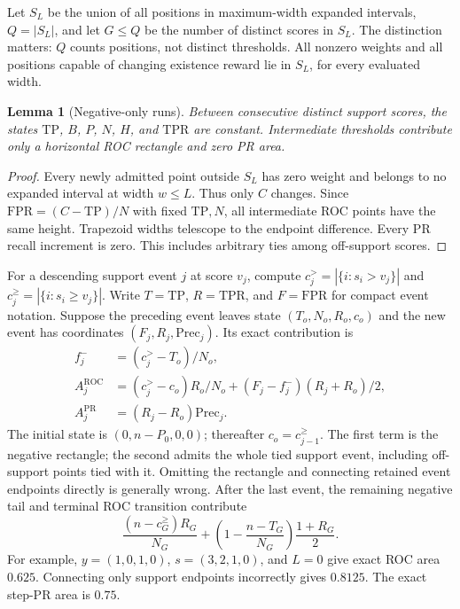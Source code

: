\documentclass[10pt]{article}
\newtheorem{lemma}{Lemma}
\newcommand{\TP}{\mathrm{TP}}
\newcommand{\TPR}{\mathrm{TPR}}
\newcommand{\FPR}{\mathrm{FPR}}
\newcommand{\Prec}{\mathrm{Prec}}
\begin{document}
Let $S_L$ be the union of all positions in maximum-width expanded intervals,
$Q=|S_L|$, and let $G\le Q$ be the number of distinct scores in $S_L$.
The distinction matters: $Q$ counts positions, not distinct thresholds.
All nonzero weights and all positions capable of changing existence reward
lie in $S_L$, for every evaluated width.

\begin{lemma}[Negative-only runs]
Between consecutive distinct support scores, the states $\TP$, $B$, $P$, $N$,
$H$, and $\TPR$ are constant. Intermediate thresholds contribute only a
horizontal ROC rectangle and zero PR area.
\end{lemma}
\begin{proof}
Every newly admitted point outside $S_L$ has zero weight and belongs to no
expanded interval at width $w\le L$. Thus only $C$ changes. Since
$\FPR=(C-\TP)/N$ with fixed $\TP,N$, all intermediate ROC points have the same
height. Trapezoid widths telescope to the endpoint difference. Every PR recall
increment is zero. This includes arbitrary ties among off-support scores.
\end{proof}

For a descending support event $j$ at score $v_j$, compute
$c_j^>=|\{i:s_i>v_j\}|$ and $c_j^\ge=|\{i:s_i\ge v_j\}|$.
Write $T=\TP$, $R=\TPR$, and $F=\FPR$ for compact event notation.
Suppose the preceding event leaves state $(T_o,N_o,R_o,c_o)$ and the new
event has coordinates $(F_j,R_j,\Prec_j)$. Its exact contribution is
\begin{align}
 f_j^-&=(c_j^>-T_o)/N_o,\\
 A_j^{\mathrm{ROC}}&=(c_j^>-c_o)R_o/N_o
 +(F_j-f_j^-)(R_j+R_o)/2,\\
 A_j^{\mathrm{PR}}&=(R_j-R_o)\Prec_j.
\end{align}
The initial state is $(0,n-P_0,0,0)$; thereafter $c_o=c_{j-1}^\ge$.
The first term is the negative rectangle; the second admits the whole tied
support event, including off-support points tied with it. Omitting the
rectangle and connecting retained event endpoints directly is generally wrong.
After the last event, the remaining negative tail and terminal ROC transition
contribute
\begin{equation}
 \frac{(n-c_G^\ge)R_G}{N_G}
 +\left(1-\frac{n-T_G}{N_G}\right)\frac{1+R_G}{2}.
\end{equation}
For example, $y=(1,0,1,0)$, $s=(3,2,1,0)$, and $L=0$ give exact ROC area
$0.625$. Connecting only support endpoints incorrectly gives $0.8125$.
The exact step-PR area is $0.75$.
\end{document}
